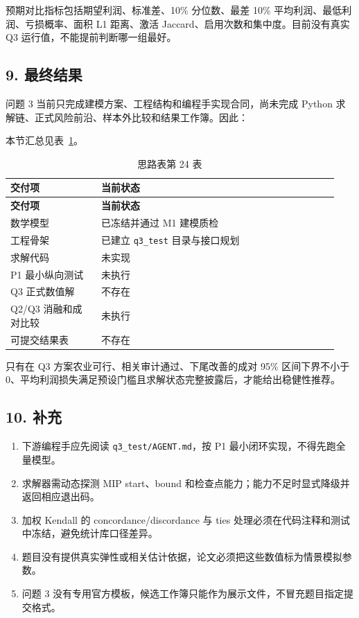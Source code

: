 \documentclass[UTF8,11pt,a4paper]{ctexart}
\begin{document}
预期对比指标包括期望利润、标准差、10\% 分位数、最差 10\% 平均利润、最低利润、亏损概率、面积 L1 距离、激活 Jaccard、启用次数和集中度。目前没有真实 Q3 运行值，不能提前判断哪一组最好。

\subsection{9. 最终结果}

问题 3 当前只完成建模方案、工程结构和编程手实现合同，尚未完成 Python 求解链、正式风险前沿、样本外比较和结果工作簿。因此：

\noindent 本节汇总见表~\ref{tab:thought-24}。
\begin{longtable}{@{}>{\raggedright\arraybackslash}p{0.26\linewidth}>{\raggedright\arraybackslash}p{0.68\linewidth}@{}}
\caption{思路表第 24 表}\label{tab:thought-24}\\
\toprule
\textbf{交付项} & \textbf{当前状态} \\
\midrule
\endfirsthead
\toprule
\textbf{交付项} & \textbf{当前状态} \\
\midrule
\endhead
数学模型 & 已冻结并通过 M1 建模质检 \\
工程骨架 & 已建立 \texttt{q3\_test} 目录与接口规划 \\
求解代码 & 未实现 \\
P1 最小纵向测试 & 未执行 \\
Q3 正式数值解 & 不存在 \\
Q2/Q3 消融和成对比较 & 未执行 \\
可提交结果表 & 不存在 \\
\bottomrule
\end{longtable}

只有在 Q3 方案农业可行、相关审计通过、下尾改善的成对 95\% 区间下界不小于 0、平均利润损失满足预设门槛且求解状态完整披露后，才能给出稳健性推荐。

\subsection{10. 补充}

\begin{enumerate}
\item 下游编程手应先阅读 \texttt{q3\_test/AGENT.md}，按 P1 最小闭环实现，不得先跑全量模型。
\item 求解器需动态探测 MIP start、bound 和检查点能力；能力不足时显式降级并返回相应退出码。
\item 加权 Kendall 的 concordance/discordance 与 ties 处理必须在代码注释和测试中冻结，避免统计库口径差异。
\item 题目没有提供真实弹性或相关估计依据，论文必须把这些数值标为情景模拟参数。
\item 问题 3 没有专用官方模板，候选工作簿只能作为展示文件，不冒充题目指定提交格式。
\end{enumerate}
\end{document}
